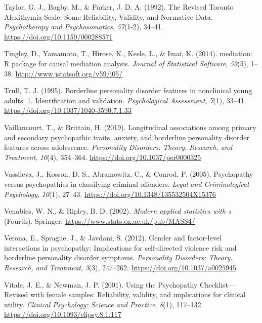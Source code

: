 \documentclass[
  man,floatsintext]{apa7}
\newlength{\cslhangindent}
\newlength{\cslentryspacingunit} %
\newenvironment{CSLReferences}[2] %
 {%
  \setlength{\parindent}{0pt}
  \ifodd #1
  \let\oldpar\par
  \def\par{\hangindent=\cslhangindent\oldpar}
  \fi
  \setlength{\parskip}{#2\cslentryspacingunit}
 }%
 {}
\begin{document}
\begin{CSLReferences}{1}{0}
\leavevmode{}%
Taylor, G. J., Bagby, M., \& Parker, J. D. A. (1992). The {Revised Toronto Alexithymia Scale}: {Some Reliability}, {Validity}, and {Normative Data}. \emph{Psychotherapy and Psychosomatics}, \emph{57}(1-2), 34--41. \url{https://doi.org/10.1159/000288571}

\leavevmode{}%
Tingley, D., Yamamoto, T., Hirose, K., Keele, L., \& Imai, K. (2014). {mediation}: {R} package for causal mediation analysis. \emph{Journal of Statistical Software}, \emph{59}(5), 1--38. \url{http://www.jstatsoft.org/v59/i05/}

\leavevmode{}%
Trull, T. J. (1995). Borderline personality disorder features in nonclinical young adults: 1. {Identification} and validation. \emph{Psychological Assessment}, \emph{7}(1), 33--41. \url{https://doi.org/10.1037/1040-3590.7.1.33}

\leavevmode{}%
Vaillancourt, T., \& Brittain, H. (2019). Longitudinal associations among primary and secondary psychopathic traits, anxiety, and borderline personality disorder features across adolescence. \emph{Personality Disorders: Theory, Research, and Treatment}, \emph{10}(4), 354--364. \url{https://doi.org/10.1037/per0000325}

\leavevmode{}%
Vassileva, J., Kosson, D. S., Abramowitz, C., \& Conrod, P. (2005). Psychopathy versus psychopathies in classifying criminal offenders. \emph{Legal and Criminological Psychology}, \emph{10}(1), 27--43. \url{https://doi.org/10.1348/135532504X15376}

\leavevmode{}%
Venables, W. N., \& Ripley, B. D. (2002). \emph{Modern applied statistics with s} (Fourth). Springer. \url{https://www.stats.ox.ac.uk/pub/MASS4/}

\leavevmode{}%
Verona, E., Sprague, J., \& Javdani, S. (2012). Gender and factor-level interactions in psychopathy: {Implications} for self-directed violence risk and borderline personality disorder symptoms. \emph{Personality Disorders: Theory, Research, and Treatment}, \emph{3}(3), 247--262. \url{https://doi.org/10.1037/a0025945}

\leavevmode{}%
Vitale, J. E., \& Newman, J. P. (2001). Using the {Psychopathy Checklist}---{Revised} with female samples: {Reliability}, validity, and implications for clinical utility. \emph{Clinical Psychology: Science and Practice}, \emph{8}(1), 117--132. \url{https://doi.org/10.1093/clipsy.8.1.117}


\end{CSLReferences}
\end{document}
